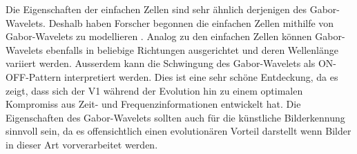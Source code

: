 Die Eigenschaften der einfachen Zellen sind sehr ähnlich derjenigen des Gabor-Wavelets.
Deshalb haben Forscher begonnen die einfachen Zellen mithilfe von Gabor-Wavelets zu modellieren \cite{paper:imgrep}.
Analog zu den einfachen Zellen können Gabor-Wavelets ebenfalls in beliebige Richtungen ausgerichtet und deren Wellenlänge variiert werden.
Ausserdem kann die Schwingung des Gabor-Wavelets als ON-OFF-Pattern interpretiert werden.
Dies ist eine sehr schöne Entdeckung, da es zeigt, dass sich der V1 während der Evolution hin zu einem optimalen Kompromiss aus Zeit- und Frequenzinformationen entwickelt hat.
Die Eigenschaften des Gabor-Wavelets sollten auch für die künstliche Bilderkennung sinnvoll sein, da es offensichtlich einen evolutionären Vorteil darstellt wenn Bilder in dieser Art vorverarbeitet werden.